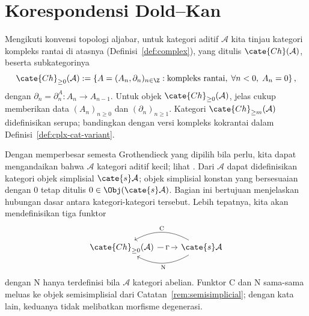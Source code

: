 
\section{Korespondensi Dold--Kan}\label{sec:Dold-Kan}
\hypertarget{o014.aljabr2.chapter8.dold-kan-a}{ }
Mengikuti konvensi topologi aljabar, untuk kategori aditif $\mathcal{A}$ kita
tinjau kategori kompleks rantai di atasnya (Definisi~\ref{def:complex}),
yang ditulis $\cate{Ch}(\mathcal{A})$, beserta subkategorinya
\[ \cate{Ch}_{\geq 0}(\mathcal{A}) := \left\{ A = (A_n, \partial_n)_{n \in \Z} : \text{kompleks rantai}, \; \forall n < 0, \; A_n = 0 \right\}, \]
dengan $\partial_n=\partial_n^A:A_n\to A_{n-1}$. Untuk objek
$\cate{Ch}_{\geq0}(\mathcal{A})$, jelas cukup memberikan data
$(A_n)_{n\geq0}$ dan $(\partial_n)_{n\geq1}$. Kategori
$\cate{Ch}_{\geq m}(\mathcal{A})$ didefinisikan serupa; bandingkan dengan
versi kompleks kokrantai dalam Definisi~\ref{def:cplx-cat-variant}.

Dengan memperbesar semesta Grothendieck yang dipilih bila perlu, kita dapat
mengandaikan bahwa $\mathcal{A}$ kategori aditif kecil; lihat
\cite[Asumsi 1.5.2]{Li1}. Dari $\mathcal{A}$ dapat didefinisikan kategori
objek simplisial $\cate{s}\mathcal{A}$; objek simplisial konstan yang
bersesuaian dengan $0$ tetap ditulis
$0\in\Obj(\cate{s}\mathcal{A})$. Bagian ini bertujuan menjelaskan hubungan
dasar antara kategori-kategori tersebut. Lebih tepatnya, kita akan
mendefinisikan tiga funktor
\[\begin{tikzcd}
	\cate{Ch}_{\geq 0}(\mathcal{A}) \arrow[r, "\Gamma" description] & \cate{s}\mathcal{A} \arrow[bend left, l, "{\mathrm{N}}"] \arrow[bend right, l, "{\mathrm{C}}"']
\end{tikzcd}\]
dengan $\mathrm{N}$ hanya terdefinisi bila $\mathcal{A}$ kategori abelian.
Funktor $\mathrm{C}$ dan $\mathrm{N}$ sama-sama meluas ke objek
semisimplisial dari Catatan~\ref{rem:semisimplicial}; dengan kata lain,
keduanya tidak melibatkan morfisme degenerasi.

